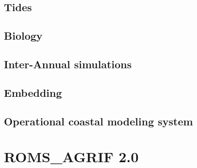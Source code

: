 \documentclass[11pt]{book}
\begin{document}
\section{Tides}


\section{Biology}


\section{Inter-Annual simulations}


\section{Embedding}


\newpage
\section{Operational coastal modeling system}



\chapter{ROMS\_AGRIF 2.0}

\newpage

\newpage


\newpage

\newpage

\newpage


\newpage
\begin{thebibliography}{}

\end{thebibliography}
\end{document}
